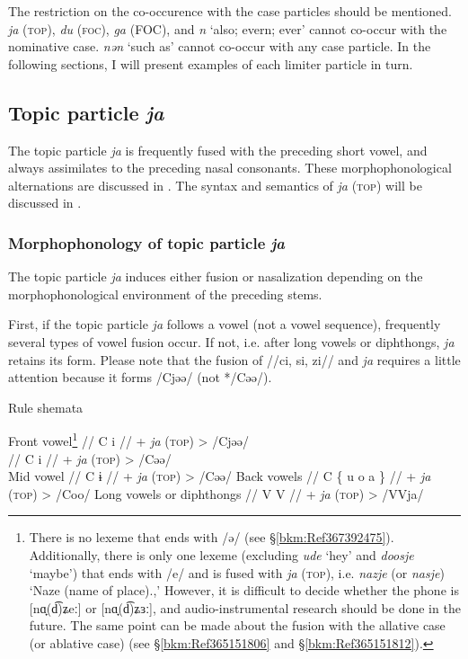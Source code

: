 The restriction on the co-occurence with the case particles should be mentioned. \textit{ja} (\textsc{top}), \textit{du} (\textsc{foc}), \textit{ga} (FOC), and \textit{n} ‘also; evern; ever’ cannot co-occur with the nominative case. \textit{nən} ‘such as’ cannot co-occur with any case particle. In the following sections, I will present examples of each limiter particle in turn.

\subsection{Topic particle \textit{ja}}\label{sec:10.1.1}

The topic particle \textit{ja} is frequently fused with the preceding short vowel, and always assimilates to the preceding nasal consonants. These morphophonological alternations are discussed in . The syntax and semantics of \textit{ja} (\textsc{top}) will be discussed in .

\subsubsection{Morphophonology of topic particle \textit{ja}}\label{sec:10.1.1.1}

The topic particle \textit{ja} induces either fusion or nasalization depending on the morphophonological environment of the preceding stems.

First, if the topic particle \textit{ja} follows a vowel (not a vowel sequence), frequently several types of vowel fusion occur. If not, i.e. after long vowels or diphthongs, \textit{ja} retains its form. Please note that the fusion of //ci, si, zi// and \textit{ja} requires a little attention because it forms /Cjəə/ (not */Cəə/).

\begin{exe}
\ex \label{ex:10.1} Rule shemata\\
  \begin{xlist}
  \exi{}Front vowel\footnote{There is no lexeme that ends with /ə/ (see §\ref{bkm:Ref367392475}). Additionally, there is only one lexeme (excluding \textit{ude} ‘hey’ and \textit{doosje} ‘maybe’) that ends with /e/ and is fused with \textit{ja} (\textsc{top}), i.e. \textit{nazje} (or \textit{nasje}) ‘Naze (name of place).,’ However, it is difficult to decide whether the phone is [nɑ̟(d͡)ʑeː] or [nɑ̟(d͡)ʑɜː], and audio-instrumental research should be done in the future. The same point can be made about the fusion with the allative case (or ablative case) (see §\ref{bkm:Ref365151806} and §\ref{bkm:Ref365151812}).}
  \ex  //  C  i  //  +  \textit{ja} (\textsc{top})  >  /Cjəə/\\\relax     [C is //c, s, z//]
  \ex  //  C  i  //  +  \textit{ja} (\textsc{top})  >  /Cəə/\\\relax    [C is not //c, s, z//]
  \exi{} Mid vowel
  \ex  //  C  ɨ  //  +  \textit{ja} (\textsc{top})  >  /Cəə/
  \exi{}Back vowels
  \ex  //   C  \{ u o a \}  //  +  \textit{ja} (\textsc{top})  >  /Coo/
  \exi{}Long vowels or diphthongs
  \ex  //  V  V  //  +  \textit{ja} (\textsc{top})  >  /VVja/
  \end{xlist}
\end{exe}

